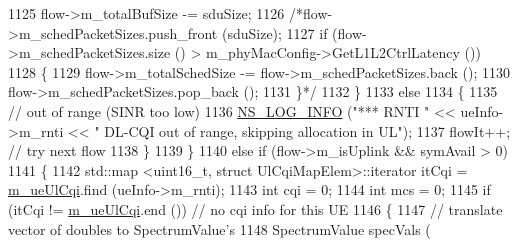 \begin{DoxyCode}
1125                                                 flow->m\_totalBufSize -= sduSize;
1126                                                 \textcolor{comment}{/*flow->m\_schedPacketSizes.push\_front (sduSize);}
1127 \textcolor{comment}{                                                if (flow->m\_schedPacketSizes.size () >
       m\_phyMacConfig->GetL1L2CtrlLatency ())}
1128 \textcolor{comment}{                                                \{}
1129 \textcolor{comment}{                                                        flow->m\_totalSchedSize -=
       flow->m\_schedPacketSizes.back ();}
1130 \textcolor{comment}{                                                        flow->m\_schedPacketSizes.pop\_back ();}
1131 \textcolor{comment}{                                                \}*/}
1132                                         \}
1133                                         \textcolor{keywordflow}{else}
1134                                         \{
1135                                                 \textcolor{comment}{// out of range (SINR too low)}
1136                                                 \hyperlink{group__logging_gafbd73ee2cf9f26b319f49086d8e860fb}{NS\_LOG\_INFO} (\textcolor{stringliteral}{"*** RNTI "} << ueInfo->m\_rnti << \textcolor{stringliteral}{"
       DL-CQI out of range, skipping allocation in UL"});
1137                                                 flowIt++; \textcolor{comment}{// try next flow}
1138                                         \}
1139                                 \}
1140                                 \textcolor{keywordflow}{else} \textcolor{keywordflow}{if} (flow->m\_isUplink && symAvail > 0)
1141                                 \{
1142                                         std::map <uint16\_t, struct UlCqiMapElem>::iterator itCqi = 
      \hyperlink{classns3_1_1MmWaveFlexTtiMaxWeightMacScheduler_ab984a5ab7fb627aa66aac421719362c9}{m\_ueUlCqi}.find (ueInfo->m\_rnti);
1143                                         \textcolor{keywordtype}{int} cqi = 0;
1144                                         \textcolor{keywordtype}{int} mcs = 0;
1145                                         \textcolor{keywordflow}{if} (itCqi != \hyperlink{classns3_1_1MmWaveFlexTtiMaxWeightMacScheduler_ab984a5ab7fb627aa66aac421719362c9}{m\_ueUlCqi}.end ()) \textcolor{comment}{// no cqi info for this UE}
1146                                         \{
1147                                                 \textcolor{comment}{// translate vector of doubles to SpectrumValue's}
1148                                                 SpectrumValue specVals (

\end{DoxyCode}
